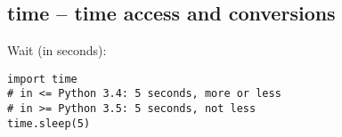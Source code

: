 \subsection{time -- time access and conversions}
Wait (in seconds):
\begin{verbatim}
import time
# in <= Python 3.4: 5 seconds, more or less
# in >= Python 3.5: 5 seconds, not less
time.sleep(5)
\end{verbatim}

%
